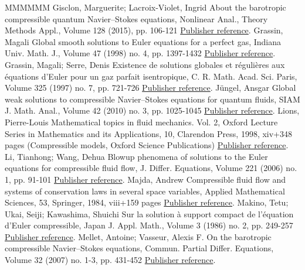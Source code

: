 \documentclass[11pt]{article}
\theoremstyle{definition}
\numberwithin{equation}{section}
\numberwithin{figure}{section}
\numberwithin{table}{section}
\newcommand*\<{\left\langle}
\renewcommand*\>{\right\rangle}
\begin{document}
\begin{thebibliography}{MMMMMM}
 Gisclon, Marguerite; Lacroix-Violet, Ingrid About the barotropic compressible quantum Navier–Stokes equations, Nonlinear Anal., Theory Methods Appl., Volume 128 (2015), pp. 106-121 \href{https://ahl.centre-mersenne.org/item/AHL_2018__1__47_0/#Gis-VV15}{Publisher reference}.
 Grassin, Magali Global smooth solutions to Euler equations for a perfect gas, Indiana Univ. Math. J., Volume 47 (1998) no. 4, pp. 1397-1432 \href{https://ahl.centre-mersenne.org/item/AHL_2018__1__47_0/#Gra98}{Publisher reference}.
 Grassin, Magali; Serre, Denis Existence de solutions globales et régulières aux équations d’Euler pour un gaz parfait isentropique, C. R. Math. Acad. Sci. Paris, Volume 325 (1997) no. 7, pp. 721-726 \href{https://ahl.centre-mersenne.org/item/AHL_2018__1__47_0/#GrSe97}{Publisher reference}.
 Jüngel, Ansgar Global weak solutions to compressible Navier–Stokes equations for quantum fluids, SIAM J. Math. Anal., Volume 42 (2010) no. 3, pp. 1025-1045 \href{https://ahl.centre-mersenne.org/item/AHL_2018__1__47_0/#Jungel}{Publisher reference}.
 Lions, Pierre-Louis Mathematical topics in fluid mechanics. Vol. 2, Oxford Lecture Series in Mathematics and its Applications, 10, Clarendon Press, 1998, xiv+348 pages (Compressible models, Oxford Science Publications) \href{https://ahl.centre-mersenne.org/item/AHL_2018__1__47_0/#Lio98}{Publisher reference}.
 Li, Tianhong; Wang, Dehua Blowup phenomena of solutions to the Euler equations for compressible fluid flow, J. Differ. Equations, Volume 221 (2006) no. 1, pp. 91-101 \href{https://ahl.centre-mersenne.org/item/AHL_2018__1__47_0/#LiWa06}{Publisher reference}.
 Majda, Andrew Compressible fluid flow and systems of conservation laws in several space variables, Applied Mathematical Sciences, 53, Springer, 1984, viii+159 pages \href{https://ahl.centre-mersenne.org/item/AHL_2018__1__47_0/#Majda}{Publisher reference}.
 Makino, Tetu; Ukai, Seiji; Kawashima, Shuichi Sur la solution à support compact de l’équation d’Euler compressible, Japan J. Appl. Math., Volume 3 (1986) no. 2, pp. 249-257 \href{https://ahl.centre-mersenne.org/item/AHL_2018__1__47_0/#MUK86}{Publisher reference}.
 Mellet, Antoine; Vasseur, Alexis F. On the barotropic compressible Navier–Stokes equations, Commun. Partial Differ. Equations, Volume 32 (2007) no. 1-3, pp. 431-452 \href{https://ahl.centre-mersenne.org/item/AHL_2018__1__47_0/#MelletVasseur}{Publisher reference}.

\end{thebibliography}
\end{document}
